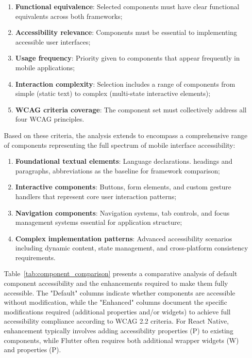 \begin{enumerate}
    \item \textbf{Functional equivalence}: Selected components must have clear functional equivalents across both frameworks;
    
    \item \textbf{Accessibility relevance}: Components must be essential to implementing accessible user interfaces;
    
    \item \textbf{Usage frequency}: Priority given to components that appear frequently in mobile applications;
    
    \item \textbf{Interaction complexity}: Selection includes a range of components from simple (static text) to complex (multi-state interactive elements);
    
    \item \textbf{WCAG criteria coverage}: The component set must collectively address all four WCAG principles.
\end{enumerate}

Based on these criteria, the analysis extends to encompass a comprehensive range of components representing the full spectrum of mobile interface accessibility:

\begin{enumerate}
    \item \textbf{Foundational textual elements}: Language declarations. headings and paragraphs, abbreviations as the baseline for framework comparison;
    
    \item \textbf{Interactive components}: Buttons, form elements, and custom gesture handlers that represent core user interaction patterns;
    
    \item \textbf{Navigation components}: Navigation systems, tab controls, and focus management systems essential for application structure;
    
    \item \textbf{Complex implementation patterns}: Advanced accessibility scenarios including dynamic content, state management, and cross-platform consistency requirements.
\end{enumerate}

\pagebreak

Table~\ref{tab:component_comparison} presents a comparative analysis of default component accessibility and the enhancements required to make them fully accessible. The "Default" columns indicate whether components are accessible without modification, while the "Enhanced" columns document the specific modifications required (additional properties and/or widgets) to achieve full accessibility compliance according to WCAG 2.2 criteria. For React Native, enhancement typically involves adding accessibility properties (P) to existing components, while Flutter often requires both additional wrapper widgets (W) and properties (P).

